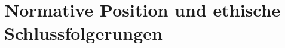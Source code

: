 \section{Normative Position und ethische Schlussfolgerungen}
\label{sec:normative}


\label{subsec:when_justified}

\label{subsubsec:necessary_conditions}

\label{subsubsec:minor_conditions}

\label{subsec:critical_contexts}

\label{subsubsec:elite_sport}

